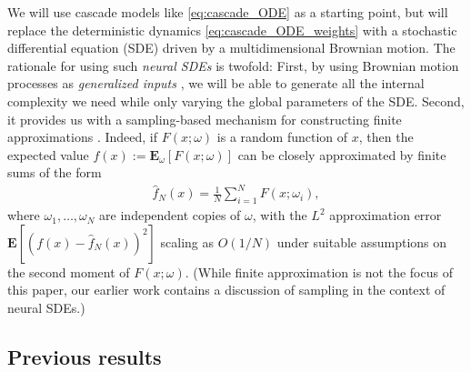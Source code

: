 \documentclass[letterpaper, 10pt, conference]{ieeeconf}
\def\Ex{{\mathbf E}} %
\def\deq{:=}
\begin{document}
We will use cascade models like \eqref{eq:cascade_ODE} as a starting point, but will replace the deterministic dynamics \eqref{eq:cascade_ODE_weights} with a stochastic differential equation (SDE) driven by a multidimensional Brownian motion.  The rationale for using such \textit{neural SDEs} \cite{Wong_1991,Tzen2019TheoreticalGF,tzen2019neural,pmlr-v108-li20i} is twofold: First, by using Brownian motion processes as \textit{generalized inputs} \cite{Sussmann_geninputs}, we will be able to generate all the internal complexity we need while only varying the global parameters of the SDE. Second, it provides us with a sampling-based mechanism for constructing finite approximations \cite{barron1993universal}. Indeed, if $F(x;\omega)$ is a random function of $x$, then the expected value $f(x) \deq \Ex_\omega[F(x;\omega)]$ can be closely approximated by finite sums of the form
\begin{align*}
	\hat{f}_N(x) = \frac{1}{N}\sum^N_{i=1}F(x;\omega_i),
\end{align*}
where $\omega_1,\dots,\omega_N$ are independent copies of $\omega$, with the $L^2$ approximation error $\Ex[(f(x)-\hat{f}_N(x))^2]$ scaling as $O(1/N)$ under suitable assumptions on the second moment of $F(x;\omega)$. (While finite approximation is not the focus of this paper, our earlier work \cite{Veeravalli_L4DC2023} contains a discussion of sampling in the context of neural SDEs.)

\subsection{Previous results}
\end{document}
